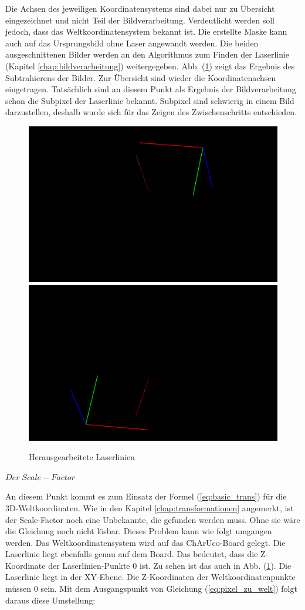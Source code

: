		Die Achsen des jeweiligen Koordinatensystems sind dabei nur zu Übersicht eingezeichnet und nicht Teil der Bildverarbeitung. Verdeutlicht werden soll jedoch, dass das Weltkoordinatensystem bekannt ist. \newline
		Die erstellte Maske kann auch auf das Ursprungsbild ohne Laser angewandt werden. Die beiden ausgeschnittenen Bilder werden an den Algorithmus zum Finden der Laserlinie (Kapitel \ref{chap:bildverarbeitung}) weitergegeben. Abb. (\ref{fig:ext-calib-laserlines}) zeigt das Ergebnis des Subtrahierens der Bilder. Zur Übersicht sind wieder die Koordinatenachsen eingetragen. Tatsächlich sind an diesem Punkt als Ergebnis der Bildverarbeitung schon die Subpixel der Laserlinie bekannt. Subpixel sind schwierig in einem Bild darzustellen, deshalb wurde sich für das Zeigen des Zwischenschritts entschieden.
		\newpage
		\begin{figure}[h!]
			\centering
			\includegraphics[width=0.49\linewidth]{img/hauptteil/ext-calib/laserline_primary.png}
			\includegraphics[width=0.49\linewidth]{img/hauptteil/ext-calib/laserline_secondary.png}
			\caption{Herausgearbeitete Laserlinien}
			\label{fig:ext-calib-laserlines}
		\end{figure}
	
		$\underline{Der \; Scale-Factor}$
		
		An diesem Punkt kommt es zum Einsatz der Formel (\ref{eq:basic_trans}) für die 3D-Weltkoordinaten. Wie in den Kapitel \ref{chap:transformationen} angemerkt, ist der Scale-Factor noch eine Unbekannte, die gefunden werden muss. Ohne sie wäre die Gleichung noch nicht lösbar. Dieses Problem kann wie folgt umgangen werden. Das Weltkoordinatensystem wird auf das ChArUco-Board gelegt. Die Laserlinie liegt ebenfalls genau auf dem Board. Das bedeutet, dass die Z-Koordinate der Laserlinien-Punkte 0 ist. Zu sehen ist das auch in Abb. (\ref{fig:ext-calib-laserlines}). Die Laserlinie liegt in der XY-Ebene. Die Z-Koordinaten der Weltkoordinatenpunkte müssen 0 sein. Mit dem Ausgangspunkt von Gleichung (\ref{eq:pixel_zu_welt}) folgt daraus diese Umstellung:
		
